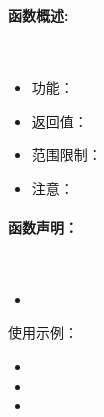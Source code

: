 \documentclass[UTF8]{article}%
\begin{document}
\section{}




\paragraph{函数概述:}~{}

\begin{itemize}
    \item 功能：
    \item 返回值：
    \item 范围限制：
    \item 注意：
\end{itemize}

\paragraph{函数声明：}~{}



\begin{itemize}
    \item 
\end{itemize}

使用示例：








\begin{itemize}
    \item 
    \item 
    \item 
\end{itemize}
\end{document}
